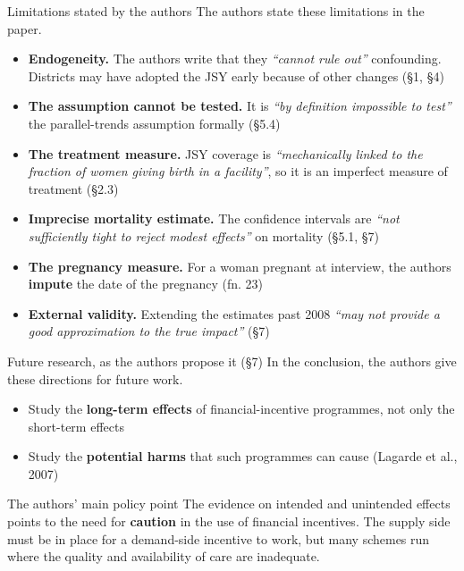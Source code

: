 \documentclass[aspectratio=169,11pt]{beamer}
\begin{document}
\begin{frame}{Limitations stated by the authors}
  The authors state these limitations in the paper.
  \begin{itemize}
    \item \textbf{Endogeneity.} The authors write that they \emph{``cannot rule out''} confounding. Districts may have adopted the JSY early because of other changes (\S1, \S4)
    \item \textbf{The assumption cannot be tested.} It is \emph{``by definition impossible to test''} the parallel-trends assumption formally (\S5.4)
    \item \textbf{The treatment measure.} JSY coverage is \emph{``mechanically linked to the fraction of women giving birth in a facility''}, so it is an imperfect measure of treatment (\S2.3)
    \item \textbf{Imprecise mortality estimate.} The confidence intervals are \emph{``not sufficiently tight to reject modest effects''} on mortality (\S5.1, \S7)
    \item \textbf{The pregnancy measure.} For a woman pregnant at interview, the authors \textbf{impute} the date of the pregnancy (fn. 23)
    \item \textbf{External validity.} Extending the estimates past 2008 \emph{``may not provide a good approximation to the true impact''} (\S7)
  \end{itemize}
\end{frame}

\begin{frame}{Future research, as the authors propose it (\S7)}
  In the conclusion, the authors give these directions for future work.
  \vspace{0.3em}
  \begin{itemize}
    \item Study the \textbf{long-term effects} of financial-incentive programmes, not only the short-term effects
    \item Study the \textbf{potential harms} that such programmes can cause (Lagarde et al., 2007)
  \end{itemize}
  \vspace{0.6em}
  \begin{block}{The authors' main policy point}
    {\footnotesize The evidence on intended and unintended effects points to the need for \textbf{caution} in the use of financial incentives. The supply side must be in place for a demand-side incentive to work, but many schemes run where the quality and availability of care are inadequate.}
  \end{block}
\end{frame}
\end{document}
